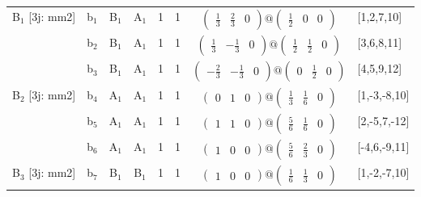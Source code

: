 \documentclass[fleqn,10pt,landscape]{article}
\begin{document}
\begin{itemize}
\begin{center}
\begin{longtable}{cc|cc|c|c|c|l}
B$_{1}$ [3j: mm2] & b$_{1}$ & B$_{1}$ & A$_{1}$ & 1 & 1 & $\begin{pmatrix} \frac{1}{3} & \frac{2}{3} & 0 \end{pmatrix}@\begin{pmatrix} \frac{1}{2} & 0 & 0 \end{pmatrix}$ & [1,2,7,10] \\
& b$_{2}$ & B$_{1}$ & A$_{1}$ & 1 & 1 & $\begin{pmatrix} \frac{1}{3} & - \frac{1}{3} & 0 \end{pmatrix}@\begin{pmatrix} \frac{1}{2} & \frac{1}{2} & 0 \end{pmatrix}$ & [3,6,8,11] \\
& b$_{3}$ & B$_{1}$ & A$_{1}$ & 1 & 1 & $\begin{pmatrix} - \frac{2}{3} & - \frac{1}{3} & 0 \end{pmatrix}@\begin{pmatrix} 0 & \frac{1}{2} & 0 \end{pmatrix}$ & [4,5,9,12] \\ \hline
B$_{2}$ [3j: mm2] & b$_{4}$ & A$_{1}$ & A$_{1}$ & 1 & 1 & $\begin{pmatrix} 0 & 1 & 0 \end{pmatrix}@\begin{pmatrix} \frac{1}{3} & \frac{1}{6} & 0 \end{pmatrix}$ & [1,-3,-8,10] \\
& b$_{5}$ & A$_{1}$ & A$_{1}$ & 1 & 1 & $\begin{pmatrix} 1 & 1 & 0 \end{pmatrix}@\begin{pmatrix} \frac{5}{6} & \frac{1}{6} & 0 \end{pmatrix}$ & [2,-5,7,-12] \\
& b$_{6}$ & A$_{1}$ & A$_{1}$ & 1 & 1 & $\begin{pmatrix} 1 & 0 & 0 \end{pmatrix}@\begin{pmatrix} \frac{5}{6} & \frac{2}{3} & 0 \end{pmatrix}$ & [-4,6,-9,11] \\ \hline
B$_{3}$ [3j: mm2] & b$_{7}$ & B$_{1}$ & B$_{1}$ & 1 & 1 & $\begin{pmatrix} 1 & 0 & 0 \end{pmatrix}@\begin{pmatrix} \frac{1}{6} & \frac{1}{3} & 0 \end{pmatrix}$ & [1,-2,-7,10] \\

\end{longtable}
\end{center}
\end{itemize}
\end{document}
